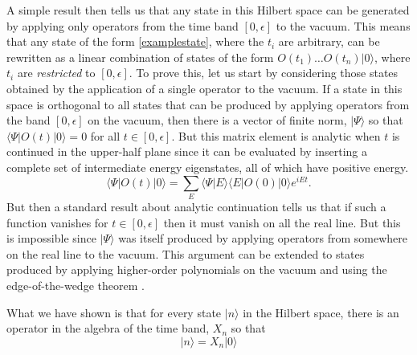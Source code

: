 \documentclass[12pt]{article}
\newcommand{\be}{\begin{equation}}
\newcommand{\ee}{\end{equation}}
\begin{document}
A simple result \cite{Banerjee:2016mhh} then tells us that any state in this Hilbert space can be generated by applying only operators from the time band $[0, \epsilon]$ to the vacuum.  This means that any state of the form \eqref{examplestate}, where the $t_i$ are arbitrary, can be rewritten as a linear combination of states of the form  $O(t_1) \ldots O(t_n) | 0 \rangle$, where $t_i$ are {\em restricted} to $[0, \epsilon]$. 
To prove this, let us start by considering those states obtained by the application of a single operator to the vacuum. If a state in this space is orthogonal to all states that can be produced by applying operators from the band $[0,\epsilon]$ on the vacuum, then there is a vector of finite norm, $|\Psi \rangle$ so that $\langle \Psi | O(t) | 0 \rangle = 0$ for all $t \in [0, \epsilon]$. But this matrix element is analytic when $t$ is continued in the upper-half plane since it can be evaluated by inserting a complete set of intermediate energy eigenstates, all of which have positive energy.
\be
\langle \Psi | O(t) | 0 \rangle = \sum_{E} \langle \Psi | E \rangle \langle E| O(0) | 0 \rangle e^{i E t}.
\ee
But then a standard result about analytic continuation tells us that if such a function vanishes for $t \in [0, \epsilon]$ then it must vanish on all the real line. But this is impossible since $|\Psi \rangle$ was itself produced by applying operators from somewhere on the real line to the vacuum. This argument can be extended to states produced by applying higher-order polynomials on the vacuum and using the edge-of-the-wedge theorem \cite{streater2016pct}.

What we have shown is that for every state $|n \rangle$ in the Hilbert space, there is an operator in the algebra of the time band, $X_n$ so that
\be
\label{rs}
|n \rangle = X_n |0 \rangle
\ee
\end{document}
